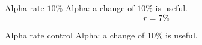 \documentclass{beamer}
\begin{document}
\begin{frame}{Alpha rate $10\%$}
Alpha: a change of $10\%$ is useful.
\[r=7\%\]
\end{frame}
\begin{frame}{Alpha rate control}
Alpha: a change of 10\% is useful.
\end{frame}
\end{document}
